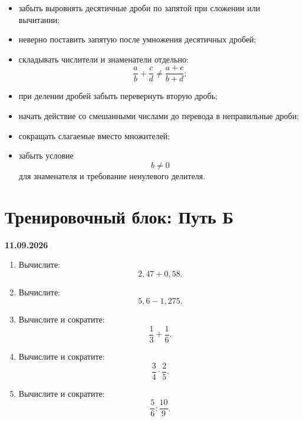 \documentclass[a4paper,12pt]{article}
\begin{document}
\begin{itemize}
  \item забыть выровнять десятичные дроби по запятой
        при сложении или вычитании;

  \item неверно поставить запятую
        после умножения десятичных дробей;

  \item складывать числители и знаменатели отдельно:
        \[
        \frac ab+\frac cd
        \ne
        \frac{a+c}{b+d};
        \]

  \item при делении дробей забыть перевернуть вторую дробь;

  \item начать действие со смешанными числами
        до перевода в неправильные дроби;

  \item сокращать слагаемые вместо множителей;

  \item забыть условие
        \[
        b\ne0
        \]
        для знаменателя
        и требование ненулевого делителя.
\end{itemize}

\clearpage

\section*{Тренировочный блок: Путь Б}

\textbf{11.09.2026}

\begin{enumerate}

  \item Вычислите:
        \[
        2{,}47+0{,}58.
        \]

  \item Вычислите:
        \[
        5{,}6-1{,}275.
        \]

  \item Вычислите и сократите:
        \[
        \frac13+\frac16.
        \]

  \item Вычислите и сократите:
        \[
        \frac34\cdot\frac25.
        \]

  \item Вычислите и сократите:
        \[
        \frac56:\frac{10}{9}.
        \]

\end{enumerate}
\end{document}
